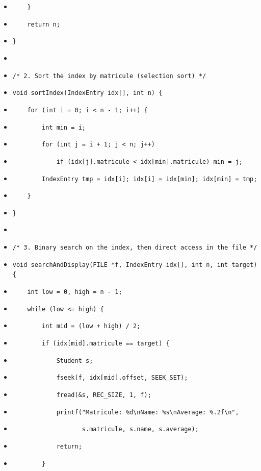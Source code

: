 \documentclass[11pt]{article}
\begin{document}
\begin{corrige}
\begin{itemize}
\item[] \texttt{\ \ \ \ \}}
\item[] \texttt{\ \ \ \ return n;}
\item[] \texttt{\}}
\item[] \texttt{}
\item[] \texttt{/* 2. Sort the index by matricule (selection sort) */}
\item[] \texttt{void sortIndex(IndexEntry idx[], int n) \{}
\item[] \texttt{\ \ \ \ for (int i = 0; i < n - 1; i++) \{}
\item[] \texttt{\ \ \ \ \ \ \ \ int min = i;}
\item[] \texttt{\ \ \ \ \ \ \ \ for (int j = i + 1; j < n; j++)}
\item[] \texttt{\ \ \ \ \ \ \ \ \ \ \ \ if (idx[j].matricule < idx[min].matricule) min = j;}
\item[] \texttt{\ \ \ \ \ \ \ \ IndexEntry tmp = idx[i]; idx[i] = idx[min]; idx[min] = tmp;}
\item[] \texttt{\ \ \ \ \}}
\item[] \texttt{\}}
\item[] \texttt{}
\item[] \texttt{/* 3. Binary search on the index, then direct access in the file */}
\item[] \texttt{void searchAndDisplay(FILE *f, IndexEntry idx[], int n, int target) \{}
\item[] \texttt{\ \ \ \ int low = 0, high = n - 1;}
\item[] \texttt{\ \ \ \ while (low <= high) \{}
\item[] \texttt{\ \ \ \ \ \ \ \ int mid = (low + high) / 2;}
\item[] \texttt{\ \ \ \ \ \ \ \ if (idx[mid].matricule == target) \{}
\item[] \texttt{\ \ \ \ \ \ \ \ \ \ \ \ Student s;}
\item[] \texttt{\ \ \ \ \ \ \ \ \ \ \ \ fseek(f, idx[mid].offset, SEEK\_SET);}
\item[] \texttt{\ \ \ \ \ \ \ \ \ \ \ \ fread(\&s, REC\_SIZE, 1, f);}
\item[] \texttt{\ \ \ \ \ \ \ \ \ \ \ \ printf("Matricule: \%d\textbackslash nName: \%s\textbackslash nAverage: \%.2f\textbackslash n",}
\item[] \texttt{\ \ \ \ \ \ \ \ \ \ \ \ \ \ \ \ \ \ \ s.matricule, s.name, s.average);}
\item[] \texttt{\ \ \ \ \ \ \ \ \ \ \ \ return;}
\item[] \texttt{\ \ \ \ \ \ \ \ \}}

\end{itemize}
\end{corrige}
\end{document}
